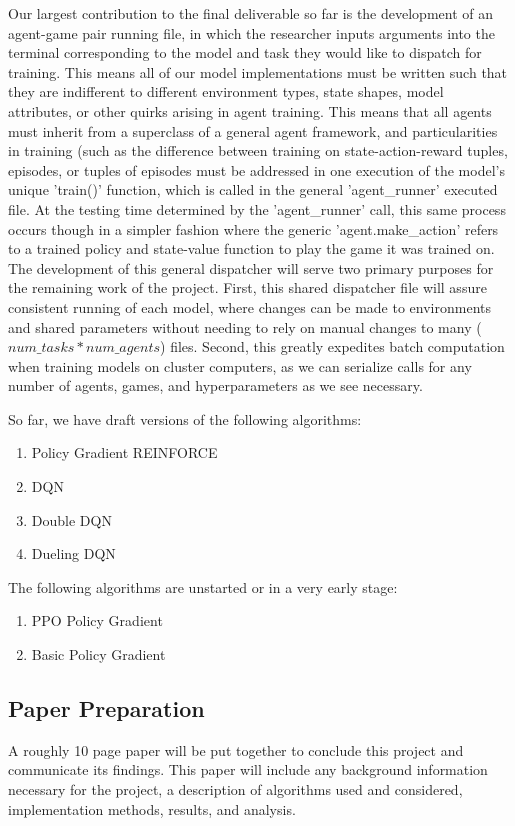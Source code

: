 \documentclass[conference]{IEEEtran}
\begin{document}
Our largest contribution to the final deliverable so far is the development of an agent-game pair running file, in which the researcher inputs arguments into the terminal corresponding to the model and task they would like to dispatch for training. This means all of our model implementations must be written such that they are indifferent to different environment types, state shapes, model attributes, or other quirks arising in agent training. This means that all agents must inherit from a superclass of a general agent framework, and particularities in training (such as the difference between training on state-action-reward tuples, episodes, or tuples of episodes must be addressed in one execution of the model's unique 'train()' function, which is called in the general 'agent\_runner' executed file.
At the testing time determined by the 'agent\_runner' call, this same process occurs though in a simpler fashion where the generic 'agent.make\_action' refers to a trained policy and state-value function to play the game it was trained on.
The development of this general dispatcher will serve two primary purposes for the remaining work of the project. First, this shared dispatcher file will assure consistent running of each model, where changes can be made to environments and shared parameters without needing to rely on manual changes to many ($num\_tasks*num\_agents$) files. Second, this greatly expedites batch computation when training models on cluster computers, as we can serialize calls for any number of agents, games, and hyperparameters as we see necessary.

So far, we have draft versions of the following algorithms:
\begin{enumerate}
\item Policy Gradient REINFORCE
\item DQN
\item Double DQN
\item Dueling DQN
\end{enumerate}

The following algorithms are unstarted or in a very early stage:
\begin{enumerate}
\item PPO Policy Gradient
\item Basic Policy Gradient
\end{enumerate}

\subsection{Paper Preparation}
A roughly 10 page paper will be put together to conclude this project and communicate its findings.
This paper will include any background information necessary for the project, a description of algorithms used and considered, implementation methods, results, and analysis.
\end{document}
